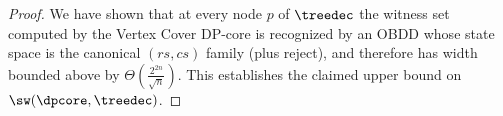 \begin{proof}
\smallskip
We have shown that at every node $p$ of $\treedec$ the witness set computed by
the {\sc Vertex Cover} DP-core is recognized by an OBDD whose state space is the
canonical $(rs,cs)$ family (plus reject), and therefore has width bounded above
by $\Theta\!\left(\frac{2^{2n}}{\sqrt{n}}\right)$. This establishes the claimed
upper bound on $\sw(\dpcore,\treedec)$.
\end{proof}

